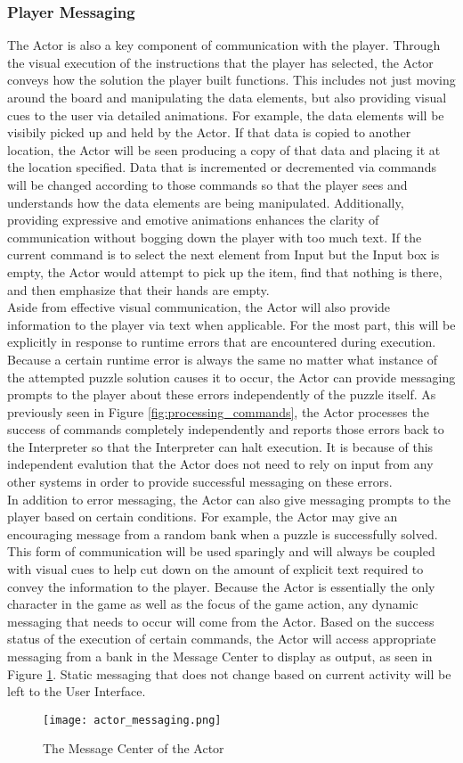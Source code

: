 \subsubsection{Player Messaging}
The Actor is also a key component of communication with the player. Through the visual execution of the instructions that the player has selected, the Actor conveys how the solution the player built functions. This includes not just moving around the board and manipulating the data elements, but also providing visual cues to the user via detailed animations. For example, the data elements will be visibily picked up and held by the Actor. If that data is copied to another location, the Actor will be seen producing a copy of that data and placing it at the location specified. Data that is incremented or decremented via commands will be changed according to those commands so that the player sees and understands how the data elements are being manipulated. Additionally, providing expressive and emotive animations enhances the clarity of communication without bogging down the player with too much text. If the current command is to select the next element from Input but the Input box is empty, the Actor would attempt to pick up the item, find that nothing is there, and then emphasize that their hands are empty.\\

Aside from effective visual communication, the Actor will also provide information to the player via text when applicable. For the most part, this will be explicitly in response to runtime errors that are encountered during execution. Because a certain runtime error is always the same no matter what instance of the attempted puzzle solution causes it to occur, the Actor can provide messaging prompts to the player about these errors independently of the puzzle itself. As previously seen in Figure \ref{fig:processing_commands}, the Actor processes the success of commands completely independently and reports those errors back to the Interpreter so that the Interpreter can halt execution. It is because of this independent evalution that the Actor does not need to rely on input from any other systems in order to provide successful messaging on these errors.\\

In addition to error messaging, the Actor can also give messaging prompts to the player based on certain conditions. For example, the Actor may give an encouraging message from a random bank when a puzzle is successfully solved. This form of communication will be used sparingly and will always be coupled with visual cues to help cut down on the amount of explicit text required to convey the information to the player. Because the Actor is essentially the only character in the game as well as the focus of the game action, any dynamic messaging that needs to occur will come from the Actor. Based on the success status of the execution of certain commands, the Actor will access appropriate messaging from a bank in the Message Center to display as output, as seen in Figure \ref{fig:actor_messaging}. Static messaging that does not change based on current activity will be left to the User Interface.\\

\begin{figure}[h]
  \caption{The Message Center of the Actor}
  \label{fig:actor_messaging}
  \centering
  \texttt{[image: actor\_messaging.png]}
\end{figure}